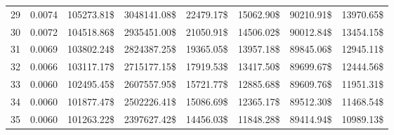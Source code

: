 \begin{tabular}{lrrrrrrr}
29 & \num{0.0074} & \num{105273.81}\$ & \num{3048141.08}\$ & \num{22479.17}\$ & \num{15062.90}\$ &  \num{90210.91}\$ & \num{13970.65}\$ \\
30 & \num{0.0072} & \num{104518.86}\$ & \num{2935451.00}\$ & \num{21050.91}\$ & \num{14506.02}\$ &  \num{90012.84}\$ & \num{13454.15}\$ \\
31 & \num{0.0069} & \num{103802.24}\$ & \num{2824387.25}\$ & \num{19365.05}\$ & \num{13957.18}\$ &  \num{89845.06}\$ & \num{12945.11}\$ \\
32 & \num{0.0066} & \num{103117.17}\$ & \num{2715177.15}\$ & \num{17919.53}\$ & \num{13417.50}\$ &  \num{89699.67}\$ & \num{12444.56}\$ \\
33 & \num{0.0060} & \num{102495.45}\$ & \num{2607557.95}\$ & \num{15721.77}\$ & \num{12885.68}\$ &  \num{89609.76}\$ & \num{11951.31}\$ \\
34 & \num{0.0060} & \num{101877.47}\$ & \num{2502226.41}\$ & \num{15086.69}\$ & \num{12365.17}\$ &  \num{89512.30}\$ & \num{11468.54}\$ \\
35 & \num{0.0060} & \num{101263.22}\$ & \num{2397627.42}\$ & \num{14456.03}\$ & \num{11848.28}\$ &  \num{89414.94}\$ & \num{10989.13}\$ \\
\bottomrule
\end{tabular}
